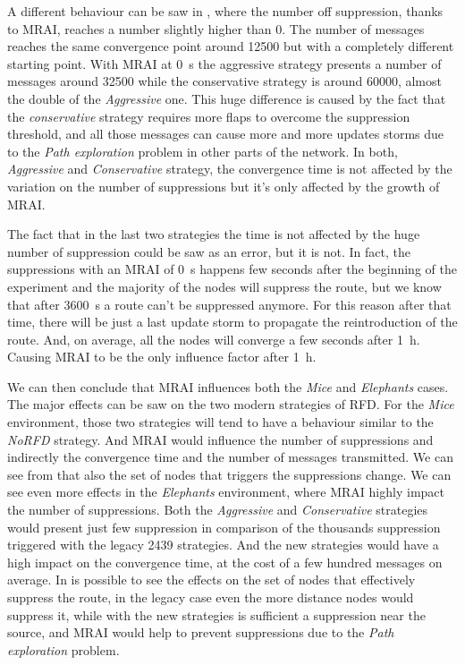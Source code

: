 A different behaviour can be saw in
,
where the number off suppression, thanks to \ac{MRAI}, reaches a number slightly
higher than \num{0}.
The number of messages reaches the same convergence point around \num{12500} but
with a completely different starting point.
With \ac{MRAI} at \SI{0}{\second} the aggressive strategy presents a number of
messages around \num{32500} while the conservative strategy is around \num{60000},
almost the double of the \textit{Aggressive} one.
This huge difference is caused by the fact that the \textit{conservative} strategy requires
more flaps to overcome the suppression threshold, and all those messages can
cause more and more updates storms due to the \textit{Path exploration} problem
in other parts of the network.
In both, \textit{Aggressive} and \textit{Conservative} strategy, the convergence
time is not affected by the variation on the number of suppressions but it's only
affected by the growth of \ac{MRAI}.

The fact that in the last two strategies the time is not affected by the huge number
of suppression could be saw as an error, but it is not.
In fact, the suppressions with an \ac{MRAI} of \SI{0}{\second} happens
few seconds after the beginning of the experiment and the majority of the nodes
will suppress the route, but we know that after \SI{3600}{\second} a route
can't be suppressed anymore.
For this reason after that time, there will be just a last update storm to propagate
the reintroduction of the route.
And, on average, all the nodes will converge a few seconds after \SI{1}{\hour}.
Causing \ac{MRAI} to be the only influence factor after \SI{1}{\hour}.

We can then conclude that \ac{MRAI} influences both the \textit{Mice} and
\textit{Elephants} cases.
The major effects can be saw on the two modern strategies of \ac{RFD}.
For the \textit{Mice} environment, those two strategies will tend to have
a behaviour similar to the \textit{NoRFD} strategy. And \ac{MRAI} would
influence the number of suppressions and indirectly the convergence time
and the number of messages transmitted.
We can see from  that also the set of
nodes that triggers the suppressions change.
We can see even more effects in the \textit{Elephants} environment, where
\ac{MRAI} highly impact the number of suppressions.
Both the \textit{Aggressive} and \textit{Conservative} strategies would present
just few suppression in comparison of the thousands suppression triggered with the
legacy \num{2439} strategies.
And the new strategies would have a high impact on the convergence time, at
the cost of a few hundred messages on average.
In  is possible to see the effects
on the set of nodes that effectively suppress the route, in the legacy
case even the more distance nodes would suppress it, while with the new
strategies is sufficient a suppression near the source, and \ac{MRAI} would
help to prevent suppressions due to the \textit{Path exploration} problem.

